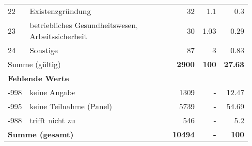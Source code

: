 \begin{longtable}{lXrrr}
        22 & \multicolumn{1}{X}{Existenzgründung} & %
          \num{32} &
          \num[round-mode=places,round-precision=2]{1.1} &
          \num[round-mode=places,round-precision=2]{0.3} \\

        23 & \multicolumn{1}{X}{betriebliches Gesundheitswesen, Arbeitssicherheit} & %
          \num{30} &
          \num[round-mode=places,round-precision=2]{1.03} &
          \num[round-mode=places,round-precision=2]{0.29} \\

        24 & \multicolumn{1}{X}{Sonstige} & %
          \num{87} &
          \num[round-mode=places,round-precision=2]{3} &
          \num[round-mode=places,round-precision=2]{0.83} \\

     \midrule
     \multicolumn{2}{l}{Summe (gültig)} &
       \textbf{\num{2900}} &
     \textbf{\num{100}} &
       \textbf{\num[round-mode=places,round-precision=2]{27.63}} \\
     \multicolumn{5}{l}{\textbf{Fehlende Werte}}\\
       -998 &
       keine Angabe &
         \num{1309} &
        - &
         \num[round-mode=places,round-precision=2]{12.47} \\
       -995 &
       keine Teilnahme (Panel) &
         \num{5739} &
        - &
         \num[round-mode=places,round-precision=2]{54.69} \\
       -988 &
       trifft nicht zu &
         \num{546} &
        - &
         \num[round-mode=places,round-precision=2]{5.2} \\
     \midrule
     \multicolumn{2}{l}{\textbf{Summe (gesamt)}} &
          \textbf{\num{10494}} &
        \textbf{-} &
        \textbf{\num{100}} \\
     \bottomrule
     \end{longtable}
     
